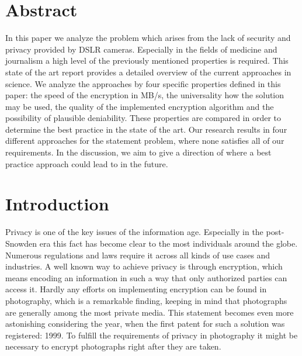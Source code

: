 \documentclass[12pt,a4paper,titlepage,oneside]{scrartcl}
\begin{document}
\maketitle
\setcounter{section}{0}
\setcounter{tocdepth}{2}
\tableofcontents
\newpage

\section*{Abstract}
In this paper we analyze the problem which arises from the lack of security and privacy provided by DSLR cameras.
Especially in the fields of medicine and journalism a high level of the previously mentioned properties is required.
This state of the art report provides a detailed overview of the current approaches in science.
We analyze the approaches by four specific properties defined in this paper: the speed of the encryption in MB/s, the universality how the solution may be used, the quality of the implemented encryption algorithm and the possibility of plausible deniability.
These properties are compared in order to determine the best practice in the state of the art.
Our research results in four different approaches for the statement problem, where none satisfies all of our requirements.
In the discussion, we aim to give a direction of where a best practice approach could lead to in the future.

\newpage
\section{Introduction}

Privacy is one of the key issues of the information age.
Especially in the post-Snowden era this fact has become clear to the most individuals around the globe. 
Numerous regulations and laws \cite{EHG2015, DSG2000, ELGA2012, EuropeanParliament2016, EuropeanCourtofHumanRights2010} require it across all kinds of use cases and industries.
A well known way to achieve privacy is through encryption, which means encoding an information in such a way that only authorized parties can access it. 
Hardly any efforts on implementing encryption can be found in photography, which is a remarkable finding, keeping in mind that photographs are generally among the most private media.
This statement becomes even more astonishing considering the year, when the first patent for such a solution was registered: 1999. \cite{steinberg1999method}
To fulfill the requirements of privacy in photography it might be necessary to encrypt photographs right after they are taken.
\end{document}
